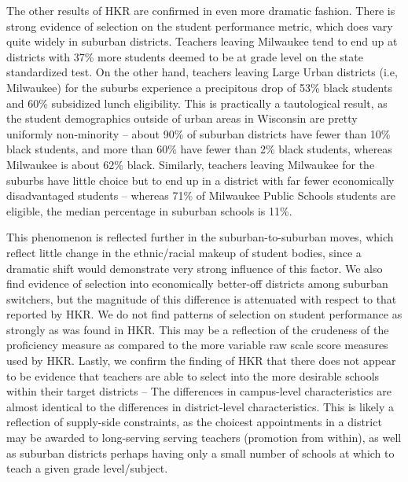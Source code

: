 \documentclass[]{article}
\begin{document}
The other results of HKR are confirmed in even more dramatic fashion.
There is strong evidence of selection on the student performance metric,
which does vary quite widely in suburban districts. Teachers leaving
Milwaukee tend to end up at districts with 37\% more students deemed to
be at grade level on the state standardized test. On the other hand,
teachers leaving Large Urban districts (i.e, Milwaukee) for the suburbs
experience a precipitous drop of 53\% black students and 60\% subsidized
lunch eligibility. This is practically a tautological result, as the
student demographics outside of urban areas in Wisconsin are pretty
uniformly non-minority -- about 90\% of suburban districts have fewer
than 10\% black students, and more than 60\% have fewer than 2\% black
students, whereas Milwaukee is about 62\% black. Similarly, teachers
leaving Milwaukee for the suburbs have little choice but to end up in a
district with far fewer economically disadvantaged students -- whereas
71\% of Milwaukee Public Schools students are eligible, the median
percentage in suburban schools is 11\%.

This phenomenon is reflected further in the suburban-to-suburban moves,
which reflect little change in the ethnic/racial makeup of student
bodies, since a dramatic shift would demonstrate very strong influence
of this factor. We also find evidence of selection into economically
better-off districts among suburban switchers, but the magnitude of this
difference is attenuated with respect to that reported by HKR. We do not
find patterns of selection on student performance as strongly as was
found in HKR. This may be a reflection of the crudeness of the
proficiency measure as compared to the more variable raw scale score
measures used by HKR. Lastly, we confirm the finding of HKR that there
does not appear to be evidence that teachers are able to select into the
more desirable schools within their target districts -- The differences
in campus-level characteristics are almost identical to the differences
in district-level characteristics. This is likely a reflection of
supply-side constraints, as the choicest appointments in a district may
be awarded to long-serving serving teachers (promotion from within), as
well as suburban districts perhaps having only a small number of schools
at which to teach a given grade level/subject.
\end{document}
